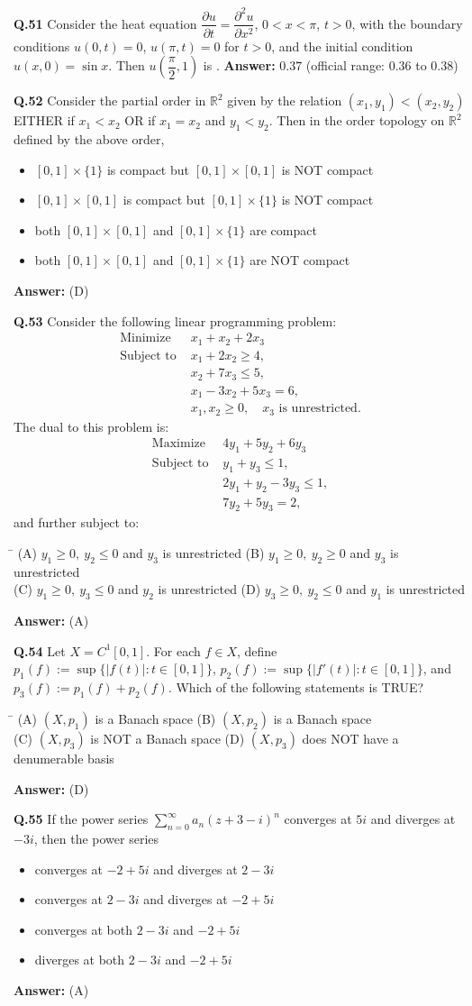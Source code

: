 \documentclass[11pt,a4paper]{article}
\newcommand{\optsfourA}[4]{%
  \begin{tabbing}
    \hspace{0.48\linewidth}\=\kill
    (A) #1 \> (B) #2 \\[2pt]
    (C) #3 \> (D) #4
  \end{tabbing}%
}
\newcommand{\optslistA}[4]{%
  \begin{itemize}
    \setlength{\itemsep}{2pt}\setlength{\parskip}{0pt}
    \item[(A)] #1
    \item[(B)] #2
    \item[(C)] #3
    \item[(D)] #4
  \end{itemize}%
}
\newcommand{\ans}[1]{\textbf{Answer:} #1\par\medskip}
\begin{document}
\textbf{Q.51} Consider the heat equation $\dfrac{\partial u}{\partial t} = \dfrac{\partial^2 u}{\partial x^2}$, $0 < x < \pi$, $t > 0$, with the boundary conditions $u(0, t) = 0$, $u(\pi, t) = 0$ for $t > 0$, and the initial condition $u(x, 0) = \sin x$. Then $u\!\left(\dfrac{\pi}{2}, 1\right)$ is \underline{\hspace{2cm}}.
\ans{$0.37$ (official range: $0.36$ to $0.38$)}

\textbf{Q.52} Consider the partial order in $\mathbb{R}^2$ given by the relation $(x_1, y_1) < (x_2, y_2)$ EITHER if $x_1 < x_2$ OR if $x_1 = x_2$ and $y_1 < y_2$. Then in the order topology on $\mathbb{R}^2$ defined by the above order,
\optslistA{$[0, 1] \times \{1\}$ is compact but $[0, 1] \times [0, 1]$ is NOT compact}{$[0, 1] \times [0, 1]$ is compact but $[0, 1] \times \{1\}$ is NOT compact}{both $[0, 1] \times [0, 1]$ and $[0, 1] \times \{1\}$ are compact}{both $[0, 1] \times [0, 1]$ and $[0, 1] \times \{1\}$ are NOT compact}
\ans{(D)}

\textbf{Q.53} Consider the following linear programming problem:
\begin{align*}
  \text{Minimize } & x_1 + x_2 + 2x_3 \\
  \text{Subject to } & x_1 + 2x_2 \ge 4, \\
                     & x_2 + 7x_3 \le 5, \\
                     & x_1 - 3x_2 + 5x_3 = 6, \\
                     & x_1, x_2 \ge 0,\quad x_3 \text{ is unrestricted.}
\end{align*}
The dual to this problem is:
\begin{align*}
  \text{Maximize } & 4y_1 + 5y_2 + 6y_3 \\
  \text{Subject to } & y_1 + y_3 \le 1, \\
                     & 2y_1 + y_2 - 3y_3 \le 1, \\
                     & 7y_2 + 5y_3 = 2,
\end{align*}
and further subject to:
\optsfourA{$y_1 \ge 0,\ y_2 \le 0$ and $y_3$ is unrestricted}{$y_1 \ge 0,\ y_2 \ge 0$ and $y_3$ is unrestricted}{$y_1 \ge 0,\ y_3 \le 0$ and $y_2$ is unrestricted}{$y_3 \ge 0,\ y_2 \le 0$ and $y_1$ is unrestricted}
\ans{(A)}

\textbf{Q.54} Let $X = C^1[0, 1]$. For each $f \in X$, define $p_1(f) := \sup\{|f(t)| : t \in [0, 1]\}$, $p_2(f) := \sup\{|f'(t)| : t \in [0, 1]\}$, and $p_3(f) := p_1(f) + p_2(f)$. Which of the following statements is TRUE?
\optsfourA{$(X, p_1)$ is a Banach space}{$(X, p_2)$ is a Banach space}{$(X, p_3)$ is NOT a Banach space}{$(X, p_3)$ does NOT have a denumerable basis}
\ans{(D)}

\textbf{Q.55} If the power series $\displaystyle\sum_{n=0}^{\infty} a_n (z + 3 - i)^n$ converges at $5i$ and diverges at $-3i$, then the power series
\optslistA{converges at $-2 + 5i$ and diverges at $2 - 3i$}{converges at $2 - 3i$ and diverges at $-2 + 5i$}{converges at both $2 - 3i$ and $-2 + 5i$}{diverges at both $2 - 3i$ and $-2 + 5i$}
\ans{(A)}
\end{document}
